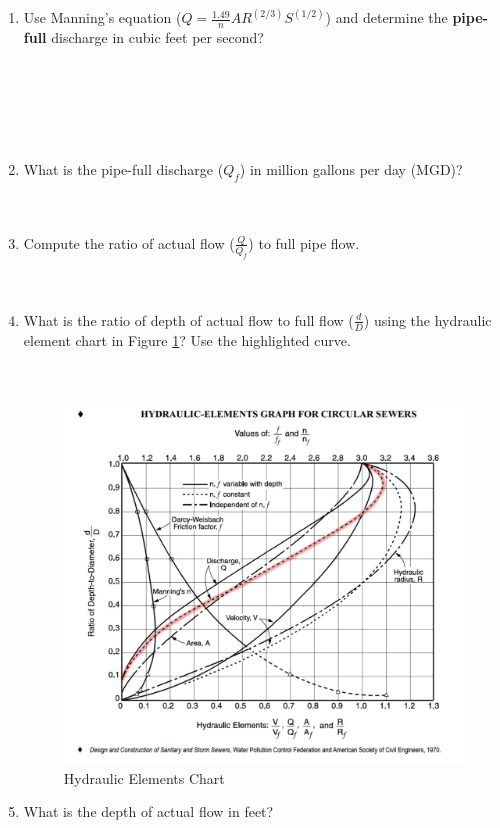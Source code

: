 \documentclass[11pt]{article}
\begin{document}
\begin{enumerate}
\begin{enumerate}
\item Use Manning's equation ($ Q = \frac{1.49}{n} A R^{(2/3)} S^{(1/2)} $) and determine the \textbf{pipe-full} discharge in cubic feet per second?
~\\
~\\
~\\
~\\
~\\
~\\
\clearpage
\item What is the pipe-full discharge ($Q_{f}$) in million gallons per day (MGD)?
~\\
~\\
~\\
\item Compute the ratio of actual flow ($\frac{Q}{Q_{f}}$) to full pipe flow.
~\\
~\\
~\\
\item What is the ratio of depth of actual flow to full flow ($\frac{d}{D}$) using the hydraulic element chart in Figure \ref{fig:hydraulic-elements}?  Use the highlighted curve.
~\\
~\\
~\\
\begin{figure}[ht!] %
\centering
   \includegraphics[width=4.5in]{hydraulic-elements.pdf}
   \caption{Hydraulic Elements Chart}
   \label{fig:hydraulic-elements} 
\end{figure}
\clearpage
\item What is the depth of actual flow in feet?

\end{enumerate}
\end{enumerate}
\end{document}
